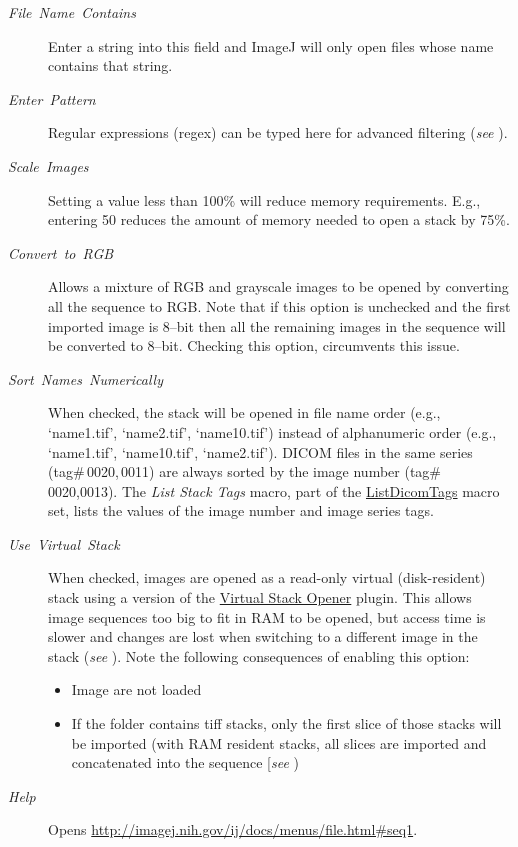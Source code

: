 \begin{description}
\item [{\emph{File\ Name\ Contains}}] Enter a string into this field
and ImageJ will only open files whose name contains that string.
\item [{\emph{Enter\ Pattern}}] Regular expressions (regex)
can be typed here for advanced filtering (\emph{see} ).
\item [{\emph{Scale\ Images}}] Setting a value less than 100\% will reduce
memory requirements. E.g., entering 50 reduces the amount of memory
needed to open a stack by 75\%. 
\item [{\emph{Convert\ to\ RGB}}] Allows a mixture of RGB and grayscale
images to be opened by converting all the sequence to RGB. Note that
if this option is unchecked and the first imported image is 8--bit
then all the remaining images in the sequence will be converted to
8--bit. Checking this option, circumvents this issue.
\item [{\emph{Sort\ Names\ Numerically}}] \improvement{}When checked,
the stack will be opened in  file name order (e.g.,
`name1.tif', `name2.tif', `name10.tif') instead of alphanumeric
order (e.g., `name1.tif', `name10.tif', `name2.tif'). DICOM
files in the same series (tag\#\,0020,\,0011) are always sorted
by the image number (tag\#\,0020,0013). The \emph{List Stack Tags}
macro, part of the \href{http://imagej.nih.gov/ij/macros/ListDicomTags.txt}{ListDicomTags}
macro set, lists the values of the image number and image series tags.
\item [{\emph{Use\ Virtual\ Stack}}] When checked, images are opened
as a read-only virtual (disk-resident) stack using a version of the
\href{http://imagej.nih.gov/ij/plugins/virtual-opener.html}{Virtual Stack Opener}
plugin. This allows image sequences too big to fit in RAM
to be opened, but access time is slower and changes are lost when
switching to a different image in the stack (\emph{see} ).
Note the following consequences of enabling this option:

\begin{itemize}
\item {}Image  are not loaded
\item If the folder contains tiff stacks, only the first slice of those
stacks will be imported (with RAM resident stacks, all slices are
imported and concatenated into the sequence {[}\emph{see} \userinterface{Image\lyxarrow{}Stacks\lyxarrow{}Tools\lyxarrow{}\nameref{sub:Concatenate...}}{]}
)
\end{itemize}
\item [{\emph{Help}}] Opens \href{http://imagej.nih.gov/ij/docs/menus/file.html\#seq1}{http://imagej.nih.gov/ij/docs/menus/file.html\#{}seq1}.
\end{description}

